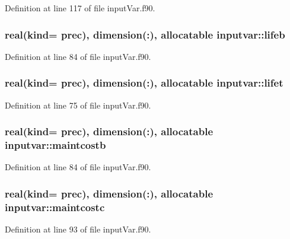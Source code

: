Definition at line 117 of file input\-Var.\-f90.

\hypertarget{classinputvar_a74dcd10e62524e2f5145df13548eae82}{
\subsubsection[{lifeb}]{\setlength{\rightskip}{0pt plus 5cm}real(kind= prec), dimension(\-:), allocatable inputvar\-::lifeb}}\label{classinputvar_a74dcd10e62524e2f5145df13548eae82}


Definition at line 84 of file input\-Var.\-f90.

\hypertarget{classinputvar_a04abed47801bdfcda1ecba21b90ab85b}{
\subsubsection[{lifet}]{\setlength{\rightskip}{0pt plus 5cm}real(kind= prec), dimension(\-:), allocatable inputvar\-::lifet}}\label{classinputvar_a04abed47801bdfcda1ecba21b90ab85b}


Definition at line 75 of file input\-Var.\-f90.

\hypertarget{classinputvar_ac52f743f02f10e96c455d94c3cdc0fe8}{
\subsubsection[{maintcostb}]{\setlength{\rightskip}{0pt plus 5cm}real(kind= prec), dimension(\-:), allocatable inputvar\-::maintcostb}}\label{classinputvar_ac52f743f02f10e96c455d94c3cdc0fe8}


Definition at line 84 of file input\-Var.\-f90.

\hypertarget{classinputvar_a4371de15edf20ae9883b07b3b843655d}{
\subsubsection[{maintcostc}]{\setlength{\rightskip}{0pt plus 5cm}real(kind= prec), dimension(\-:), allocatable inputvar\-::maintcostc}}\label{classinputvar_a4371de15edf20ae9883b07b3b843655d}


Definition at line 93 of file input\-Var.\-f90.

